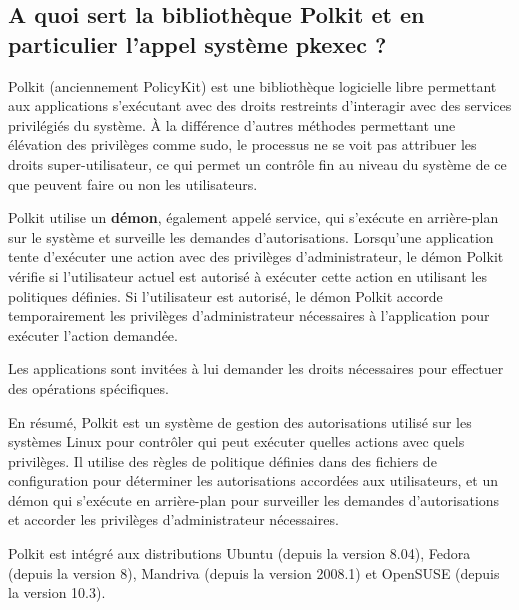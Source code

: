 \documentclass[12pt,a4paper]{article}
\begin{document}
\begin{flushleft}
            \subsection{A quoi sert la bibliothèque Polkit et en particulier l'appel système pkexec ? }
            \begin{flushleft}
                \noindent Polkit (anciennement PolicyKit) est une bibliothèque logicielle libre permettant aux applications s'exécutant avec des droits restreints d'interagir avec des services privilégiés du système. À la différence d'autres méthodes permettant une élévation des privilèges comme sudo, le processus ne se voit pas attribuer les droits super-utilisateur, ce qui permet un contrôle fin au niveau du système de ce que peuvent faire ou non les utilisateurs. \cite{policyki47:online}
                \item Polkit utilise un \textbf{démon}, également appelé service, qui s'exécute en arrière-plan sur le système et surveille les demandes d'autorisations. Lorsqu'une application tente d'exécuter une action avec des privilèges d'administrateur, le démon Polkit vérifie si l'utilisateur actuel est autorisé à exécuter cette action en utilisant les politiques définies. Si l'utilisateur est autorisé, le démon Polkit accorde temporairement les privilèges d'administrateur nécessaires à l'application pour exécuter l'action demandée.
                \item Les applications sont invitées à lui demander les droits nécessaires pour effectuer des opérations spécifiques.
                \item En résumé, Polkit est un système de gestion des autorisations utilisé sur les systèmes Linux pour contrôler qui peut exécuter quelles actions avec quels privilèges. Il utilise des règles de politique définies dans des fichiers de configuration pour déterminer les autorisations accordées aux utilisateurs, et un démon qui s'exécute en arrière-plan pour surveiller les demandes d'autorisations et accorder les privilèges d'administrateur nécessaires.
                \item Polkit est intégré aux distributions Ubuntu (depuis la version 8.04), Fedora (depuis la version 8), Mandriva (depuis la version 2008.1) et OpenSUSE (depuis la version 10.3).

\end{flushleft}
\end{flushleft}
\end{document}
